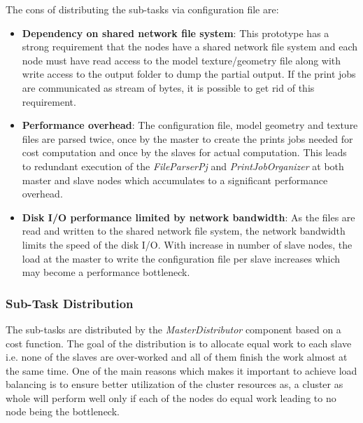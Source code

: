 The cons of distributing the sub-tasks via configuration file are: 
\begin{itemize}
\item \textbf{Dependency on shared network file system}: This prototype has a strong requirement that the nodes have a shared network file system and each node must have read access to the model texture/geometry file along with write access to the output folder to dump the partial output. If the print jobs are communicated as stream of bytes, it is possible to get rid of this requirement.
\item \textbf{Performance overhead}: The configuration file, model geometry and texture files are parsed twice, once by the master to create the prints jobs needed for cost computation and once by the slaves for actual computation. This leads to redundant execution of the \textit{FileParserPj} and \textit{PrintJobOrganizer} at both master and slave nodes which accumulates to a significant performance overhead.
\item \textbf{Disk I/O performance limited by network bandwidth}: As the files are read and written to the shared network file system, the network bandwidth limits the speed of the disk I/O. With increase in number of slave nodes, the load at the master to write the configuration file per slave increases which may become a performance bottleneck. 
\end{itemize}

\subsubsection{Sub-Task Distribution}

The sub-tasks are distributed by the \textit{MasterDistributor} component based on a cost function. The goal of the distribution is to allocate equal work to each slave i.e. none of the slaves are over-worked and all of them finish the work almost at the same time. One of the main reasons which makes it important to achieve load balancing is to ensure better utilization of the cluster resources as, a cluster as whole will perform well only if each of the nodes do equal work leading to no node being the bottleneck. 

